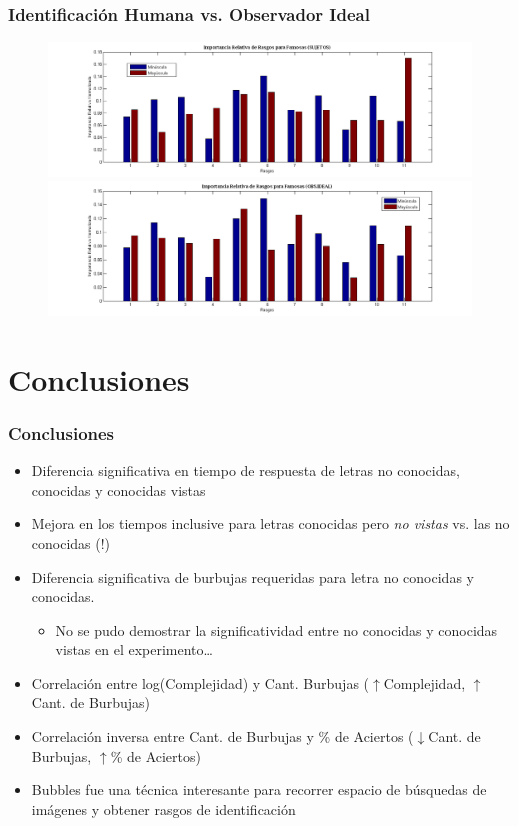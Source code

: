 \documentclass[10pt]{beamer}
\begin{document}
 	\begin{frame}
	\frametitle{Identificaci\'on Humana vs. Observador Ideal}
	    \begin{figure}
		\includegraphics[width=\textwidth]{graficos/importanciaRelativa_Famosas.png}\\
		\includegraphics[width=\textwidth]{graficos/importanciaRelativa_Famosas_ideal.png}
	    \end{figure}
	\end{frame}


  \section{Conclusiones}
	\begin{frame}
	\frametitle{Conclusiones}
	    \begin{itemize}
		\item Diferencia significativa en tiempo de respuesta de letras no conocidas, conocidas y conocidas vistas
		\item Mejora en los tiempos inclusive para letras conocidas pero \emph{no vistas} vs. las no conocidas \alert{(!)}
		\item Diferencia significativa de burbujas requeridas para letra no conocidas y conocidas.
		\begin{itemize}
		    \item No se pudo demostrar la significatividad entre no conocidas y conocidas vistas en el experimento\ldots
		\end{itemize}
		\item Correlación entre log(Complejidad) y Cant. Burbujas (\alert{\bf$\uparrow$}Complejidad, \alert{\bf$\uparrow$}Cant. de Burbujas)
		\item Correlación inversa entre Cant. de Burbujas y \% de Aciertos (\alert{\bf$\downarrow$}Cant. de Burbujas, \alert{\bf$\uparrow$}\% de Aciertos)
		\item Bubbles fue una técnica interesante para recorrer espacio de búsquedas de imágenes y obtener rasgos de identificación
	    \end{itemize}
	\end{frame}
\end{document}
